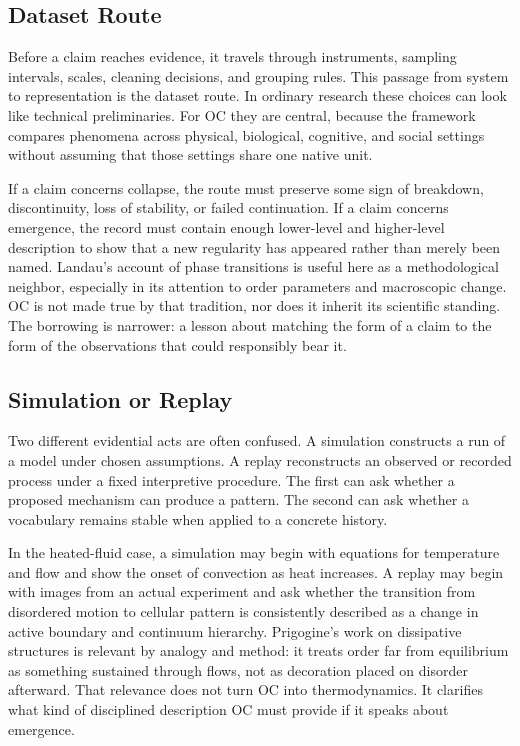 \documentclass[11pt,a4paper,openany]{book}
\begin{document}
\subsection{Dataset Route}
Before a claim reaches evidence, it travels through instruments, sampling intervals, scales, cleaning decisions, and grouping rules. This passage from system to representation is the dataset route. In ordinary research these choices can look like technical preliminaries. For OC they are central, because the framework compares phenomena across physical, biological, cognitive, and social settings without assuming that those settings share one native unit. \cite{wilson_renormalization,landau_stat_physics}\par
If a claim concerns collapse, the route must preserve some sign of breakdown, discontinuity, loss of stability, or failed continuation. If a claim concerns emergence, the record must contain enough lower-level and higher-level description to show that a new regularity has appeared rather than merely been named. Landau's account of phase transitions is useful here as a methodological neighbor, especially in its attention to order parameters and macroscopic change. OC is not made true by that tradition, nor does it inherit its scientific standing. The borrowing is narrower: a lesson about matching the form of a claim to the form of the observations that could responsibly bear it.\par
\subsection{Simulation or Replay}
Two different evidential acts are often confused. A simulation constructs a run of a model under chosen assumptions. A replay reconstructs an observed or recorded process under a fixed interpretive procedure. The first can ask whether a proposed mechanism can produce a pattern. The second can ask whether a vocabulary remains stable when applied to a concrete history. \cite{wilson_renormalization,landau_stat_physics}\par
In the heated-fluid case, a simulation may begin with equations for temperature and flow and show the onset of convection as heat increases. A replay may begin with images from an actual experiment and ask whether the transition from disordered motion to cellular pattern is consistently described as a change in active boundary and continuum hierarchy. Prigogine's work on dissipative structures is relevant by analogy and method: it treats order far from equilibrium as something sustained through flows, not as decoration placed on disorder afterward. That relevance does not turn OC into thermodynamics. It clarifies what kind of disciplined description OC must provide if it speaks about emergence.\par
\end{document}
